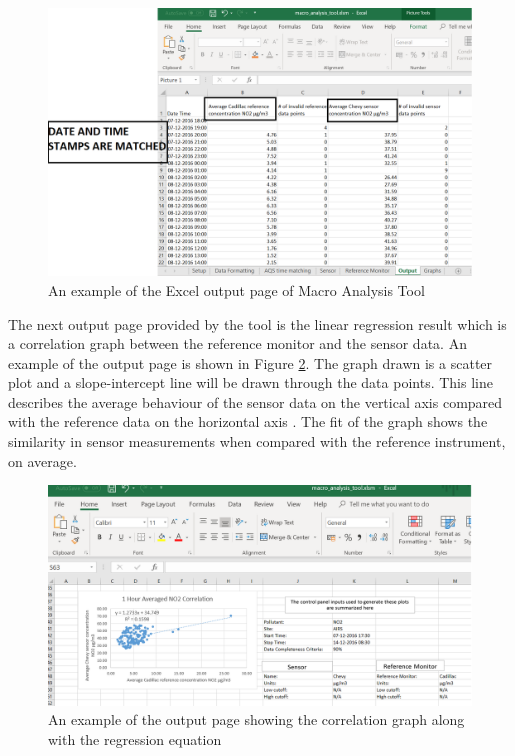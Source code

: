 \begin{figure}[h]
    \begin{center}
    \includegraphics[scale=0.55]{./images/figure6.png}
    \end{center}
    \caption{An example of the Excel output page of Macro Analysis Tool \cite{MATEXCEL}}
    \label{MAT}
    \hspace{1 cm}
  \end{figure}

\par


The next output page provided by the tool is the linear regression result which is a correlation graph between the reference monitor and the sensor data. An example of the output page is shown in Figure \ref{cor}. The graph drawn is a scatter plot and a slope-intercept line will be drawn through the data points. This line describes the average behaviour of the sensor data on the vertical axis compared with the reference data on the horizontal axis \cite{National2017}. The fit of the graph shows the similarity in sensor measurements when compared with the reference instrument, on average. 

\hspace{1 cm}
\begin{figure}[h]
    \begin{center}
    \includegraphics[scale=0.50]{./images/figure7.png}
    \end{center}
    \caption{An example of the output page showing the correlation graph along with the regression equation}
    \label{cor}
  \end{figure}
 
